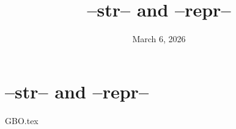 \documentclass{exam}
\title{--str-- and --repr--}
\date{March 6, 2026}
\begin{document}
\maketitle

\section{--str-- and --repr--}
\begin{questions}
{GBO.tex}
\end{questions}
\end{document}
